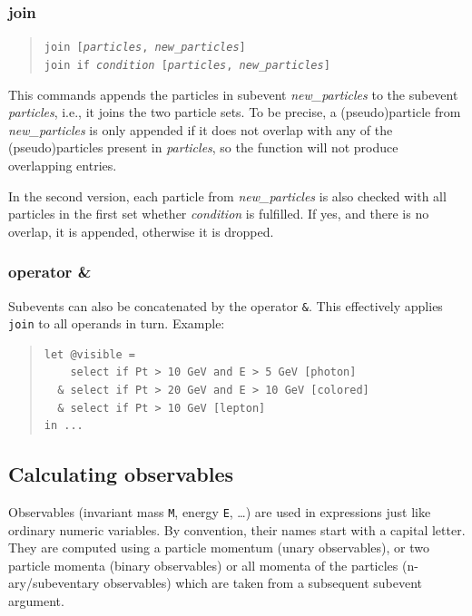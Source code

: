\documentclass[12pt]{book}
\newcommand{\ttt}[1]{\texttt{#1}}
\begin{document}
\subsubsection{join}
\begin{quote}
\begin{footnotesize}
  \ttt{join [\textit{particles}, \textit{new\_particles}]} \\
  \ttt{join if \textit{condition} [\textit{particles}, \textit{new\_particles}]}
\end{footnotesize}
\end{quote}
This commands appends the particles in subevent \textit{new\_particles} to the
subevent \textit{particles}, i.e., it joins the two particle sets.  To be
precise, a (pseudo)particle from \textit{new\_particles} is only appended if it
does not overlap with any of the (pseudo)particles
present in \textit{particles}, so the function will not produce overlapping
entries.

In the second version, each particle from \textit{new\_particles} is also
checked with all particles in the first set whether \textit{condition} is
fulfilled.  If yes, and there is no overlap, it is appended, otherwise
it is dropped.


\subsubsection{operator \&}

Subevents can also be concatenated by the operator \verb|&|.  This effectively
applies \ttt{join} to all operands in turn.  Example:
\begin{quote}
\begin{footnotesize}
\begin{verbatim}
let @visible =
    select if Pt > 10 GeV and E > 5 GeV [photon]
  & select if Pt > 20 GeV and E > 10 GeV [colored]
  & select if Pt > 10 GeV [lepton]
in ...
\end{verbatim}
\end{footnotesize}
\end{quote}


\subsection{Calculating observables}

Observables (invariant mass \ttt{M}, energy \ttt{E}, \ldots) are used in
expressions just like ordinary numeric variables.  By convention, their names
start with a capital letter.  They are computed using a particle
momentum (unary observables), or two particle momenta (binary
observables) or all momenta of the particles (n-ary/subeventary
observables) which are taken from a subsequent subevent argument.
\end{document}
